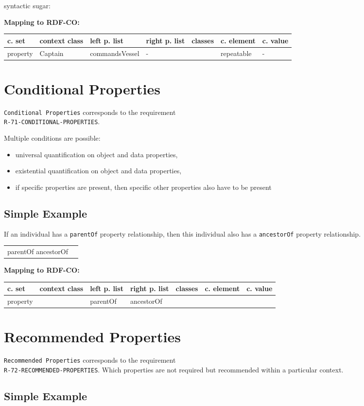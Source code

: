 \documentclass{llncs}
\newcommand{\ms}[1]{\texttt{#1}}
\newenvironment{gcotable}{
  \scriptsize
  \sffamily
  \vspace{0cm}
	\begin{center}
	\textbf{\vspace{0.4cm}Mapping to RDF-CO:} \\
  \begin{tabular}{l|l|l|l|l|l|l}
	\hline
  \textbf{c. set} & \textbf{context class} & \textbf{left p. list} & \textbf{right p. list} & \textbf{classes} & \textbf{c. element} & \textbf{c. value} \\
  \hline

}{
  \hline
  \end{tabular}
	\end{center}
}
\newenvironment{DL}{
\vspace{0cm}
	\begin{center}
  \begin{tabular}{r l}

}{
  \end{tabular}
	\end{center}
}
\begin{document}
syntactic sugar:

\begin{gcotable}
property & Captain & commandsVessel & - &  & repeatable & - \\
\end{gcotable}

\section{Conditional Properties}

\ms{Conditional Properties} corresponds to the requirement \\
\ms{R-71-CONDITIONAL-PROPERTIES}.

Multiple conditions are possible:

\begin{itemize}
  \item universal quantification on object and data properties,
  \item existential quantification on object and data properties,
  \item if specific properties are present, then specific other properties also have to be present
\end{itemize}

\subsection{Simple Example}

If an individual has a \ms{parentOf} property relationship, then this individual also has a \ms{ancestorOf} property relationship.

\begin{DL}
parentOf  ancestorOf 
\end{DL}

\begin{gcotable}
property &  & parentOf & ancestorOf &  &  \\
\end{gcotable}

\section{Recommended Properties}

\ms{Recommended Properties} corresponds to the requirement \\
\ms{R-72-RECOMMENDED-PROPERTIES}.
Which properties are not required but recommended within a particular context.

\subsection{Simple Example}
\end{document}
